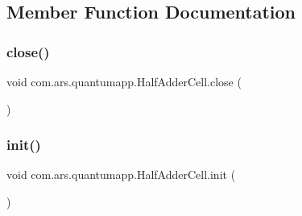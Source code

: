 \subsection{Member Function Documentation}
\hypertarget{classcom_1_1ars_1_1quantumapp_1_1_half_adder_cell_a9ce49c4de6b6267d794c9543e185e976}{}\label{classcom_1_1ars_1_1quantumapp_1_1_half_adder_cell_a9ce49c4de6b6267d794c9543e185e976} 
\subsubsection{\texorpdfstring{close()}{close()}}
{\footnotesize\ttfamily void com.\+ars.\+quantumapp.\+Half\+Adder\+Cell.\+close (\begin{DoxyParamCaption}{ }\end{DoxyParamCaption})}

\hypertarget{classcom_1_1ars_1_1quantumapp_1_1_half_adder_cell_a077ff8604fb9f4b2043ab4264327f4b4}{}\label{classcom_1_1ars_1_1quantumapp_1_1_half_adder_cell_a077ff8604fb9f4b2043ab4264327f4b4} 
\subsubsection{\texorpdfstring{init()}{init()}}
{\footnotesize\ttfamily void com.\+ars.\+quantumapp.\+Half\+Adder\+Cell.\+init (\begin{DoxyParamCaption}{ }\end{DoxyParamCaption})}

